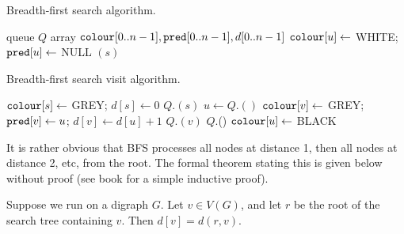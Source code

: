 \begin{algorithm}[H]
  \caption{Breadth-first search algorithm.}
    \label{alg:BFScode}
\begin{algorithmic}[1]
	\State queue $Q$  
	\State array $\colour[0..n-1], \pred[0..n-1], d[0..n-1]$
		\State $\colour[u] \gets $ WHITE; $\pred[u] \gets $ NULL
	\EndFor
			\State {}$(s)$
		\EndIf
	\EndFor
	\State {}
\EndFunction
\end{algorithmic}
\end{algorithm}
\begin{algorithm}[H]
  \caption{Breadth-first search visit algorithm.}
     \label{alg:BFSvisitcode}
  \begin{algorithmic}[1]
	\State $\colour[s] \gets $ GREY; $d[s] \gets 0$ 
	\State $Q$.$(s)$
		\State $u \gets Q$.$()$
				\State $\colour[v] \gets $ GREY; $\pred[v] \gets u$; $d[v] \gets d[u]+1$
				\State $Q$.$(v)$
			\EndIf
		\EndFor
		\State $Q$.()
		\State $\colour[u] \gets $ BLACK
	\EndWhile
\EndFunction
\end{algorithmic}
\end{algorithm}


It is rather obvious that BFS processes all nodes at distance 1, then
all nodes at distance 2, etc, from the root. The formal theorem stating this is given below without proof (see book for a simple inductive proof).

\begin{Theorem}
\label{thm:BFSdist}
Suppose we run  on a digraph $G$.
Let $v\in V(G)$, and let $r$ be the root of the search tree containing $v$. 
Then $d[v] = d(r, v)$.
\end{Theorem}

